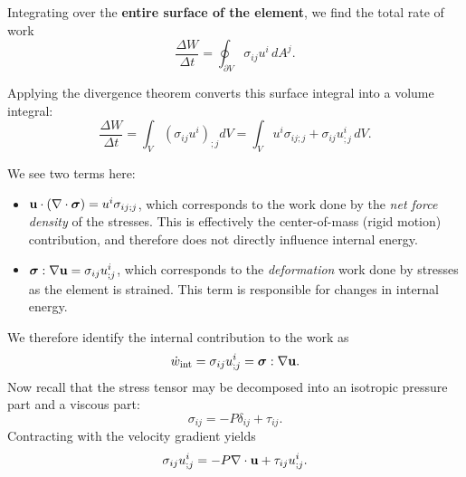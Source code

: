 Integrating over the \textbf{entire surface of the element}, we find the total rate of work
\[
\frac{\Delta W}{\Delta t} = \oint_{\partial V} \sigma_{ij} u^i \, dA^j.
\]

Applying the divergence theorem converts this surface integral into a volume integral:
\[
\frac{\Delta W}{\Delta t} = \int_V \left(\sigma_{ij} u^i\right)_{;j} dV
= \int_V u^i \sigma_{ij;j} + \sigma_{ij} u^i_{;j} \, dV.
\]
\begin{remark}
We see two terms here:
\begin{itemize}
    \item ${\bf u} \cdot (\nabla \cdot \boldsymbol{\sigma}) = u^i\sigma_{ij;j}$, which corresponds 
    to the work done by the \emph{net force density} of the stresses. This is effectively the
    center-of-mass (rigid motion) contribution, and therefore does not directly influence
    internal energy.
    \item $\boldsymbol{\sigma} : \nabla {\bf u} = \sigma_{ij} u^i_{;j}$, which corresponds to the 
    \emph{deformation} work done by stresses as the element is strained. This term is responsible
    for changes in internal energy.
\end{itemize}
\end{remark}
\noindent
We therefore identify the internal contribution to the work as
\[
\dot{w}_{\rm int} = \sigma_{ij} u^i_{;j} = \boldsymbol{\sigma} : \nabla {\bf u}.
\]
Now recall that the stress tensor may be decomposed into an isotropic pressure part and a
viscous part:
\[
\sigma_{ij} = -P \delta_{ij} + \tau_{ij}.
\]
Contracting with the velocity gradient yields
\[
\sigma_{ij} u^i_{;j} = -P \nabla \cdot {\bf u} + \tau_{ij} u^i_{;j}.
\]


